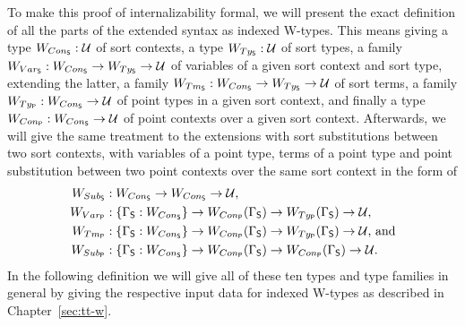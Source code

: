 To make this proof of internalizability formal, we will present the exact definition
of all the parts of the extended syntax as indexed W-types.
This means giving a type $W_{Con_{\mathsf{S}}} : \mathcal{U}$ of sort contexts,
a type $W_{Ty_{\mathsf{S}}} : \mathcal{U}$ of sort types,
a family $W_{Var_{\mathsf{S}}} : W_{Con_{\mathsf{S}}} \to W_{Ty_{\mathsf{S}}} \to \mathcal{U}$ of variables of a given
sort context and sort type,
extending the latter, a family $W_{Tm_{\mathsf{S}}} : W_{Con_{\mathsf{S}}} \to W_{Ty_{\mathsf{S}}} \to \mathcal{U}$
of sort terms,
a family $W_{Ty_{\mathsf{P}}} : W_{Con_{\mathsf{S}}} \to \mathcal{U}$ of point types in a given sort context,
and finally a type $W_{Con_{\mathsf{P}}} : W_{Con_{\mathsf{S}}} \to \mathcal{U}$ of point contexts over a
given sort context.
Afterwards, we will give the same treatment to the extensions with
sort substitutions between two sort contexts, with variables
of a point type, terms of a point type and point substitution between two point
contexts over the same sort context in the form of
\begin{align*}
W_{Sub_{\mathsf{S}}}
  &: W_{Con_{\mathsf{S}}} \to W_{Con_{\mathsf{S}}} \to \mathcal{U} \text{,} \\
W_{Var_{\mathsf{P}}}
  &: \{\Gamma_{\mathsf{S}} : W_{Con_{\mathsf{S}}}\} \to W_{Con_{\mathsf{P}}}(\Gamma_{\mathsf{S}}) \to W_{Ty_{\mathsf{P}}}(\Gamma_{\mathsf{S}}) \to \mathcal{U} \text{,}\\
W_{Tm_{\mathsf{P}}}
  &: \{\Gamma_{\mathsf{S}} : W_{Con_{\mathsf{S}}}\} \to W_{Con_{\mathsf{P}}}(\Gamma_{\mathsf{S}}) \to W_{Ty_{\mathsf{P}}}(\Gamma_{\mathsf{S}}) \to \mathcal{U} \text{, and}\\
W_{Sub_{\mathsf{P}}}
  &: \{\Gamma_{\mathsf{S}} : W_{Con_{\mathsf{S}}}\} \to W_{Con_{\mathsf{P}}}(\Gamma_{\mathsf{S}}) \to W_{Con_{\mathsf{P}}}(\Gamma_{\mathsf{S}}) \to \mathcal{U} \text{.}
\end{align*}
In the following definition we will give all of these ten types and type families
in general by giving the respective input data for indexed W-types as described
in Chapter~\ref{sec:tt-w}.

